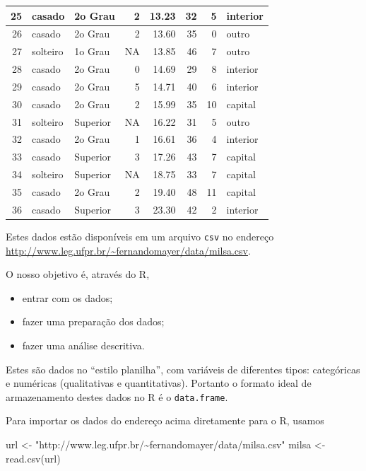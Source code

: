 \documentclass[
  10pt,
  a4paper]{book}
\newenvironment{Shaded}{\begin{snugshade}}{\end{snugshade}}
\newcommand{\FunctionTok}[1]{\textcolor[rgb]{0.00,0.00,0.00}{#1}}
\newcommand{\NormalTok}[1]{#1}
\newcommand{\OtherTok}[1]{\textcolor[rgb]{0.56,0.35,0.01}{#1}}
\newcommand{\StringTok}[1]{\textcolor[rgb]{0.31,0.60,0.02}{#1}}
\providecommand{\tightlist}{%
  \setlength{\itemsep}{0pt}\setlength{\parskip}{0pt}}
\begin{document}
\begin{tabular}{r|l|l|r|r|r|r|l}
\hline
25 & casado & 2o Grau & 2 & 13.23 & 32 & 5 & interior\\
\hline
26 & casado & 2o Grau & 2 & 13.60 & 35 & 0 & outro\\
\hline
27 & solteiro & 1o Grau & NA & 13.85 & 46 & 7 & outro\\
\hline
28 & casado & 2o Grau & 0 & 14.69 & 29 & 8 & interior\\
\hline
29 & casado & 2o Grau & 5 & 14.71 & 40 & 6 & interior\\
\hline
30 & casado & 2o Grau & 2 & 15.99 & 35 & 10 & capital\\
\hline
31 & solteiro & Superior & NA & 16.22 & 31 & 5 & outro\\
\hline
32 & casado & 2o Grau & 1 & 16.61 & 36 & 4 & interior\\
\hline
33 & casado & Superior & 3 & 17.26 & 43 & 7 & capital\\
\hline
34 & solteiro & Superior & NA & 18.75 & 33 & 7 & capital\\
\hline
35 & casado & 2o Grau & 2 & 19.40 & 48 & 11 & capital\\
\hline
36 & casado & Superior & 3 & 23.30 & 42 & 2 & interior\\
\hline
\end{tabular}

Estes dados estão disponíveis em um arquivo \texttt{csv} no endereço
\url{http://www.leg.ufpr.br/~fernandomayer/data/milsa.csv}.

O nosso objetivo é, através do R,

\begin{itemize}
\tightlist
\item
  entrar com os dados;
\item
  fazer uma preparação dos dados;
\item
  fazer uma análise descritiva.
\end{itemize}

Estes são dados no ``estilo planilha'', com variáveis de diferentes tipos:
categóricas e numéricas (qualitativas e quantitativas). Portanto o
formato ideal de armazenamento destes dados no R é o \texttt{data.frame}.

Para importar os dados do endereço acima diretamente para o R, usamos

\begin{Shaded}
\begin{Highlighting}[]
\NormalTok{url }\OtherTok{\textless{}{-}} \StringTok{"http://www.leg.ufpr.br/\textasciitilde{}fernandomayer/data/milsa.csv"}
\NormalTok{milsa }\OtherTok{\textless{}{-}} \FunctionTok{read.csv}\NormalTok{(url)}
\end{Highlighting}
\end{Shaded}
\end{document}
